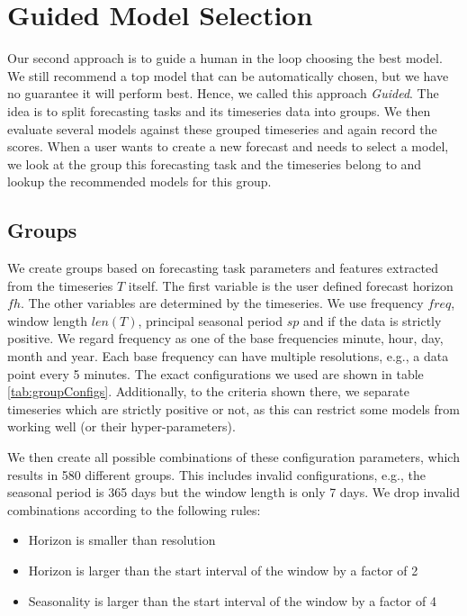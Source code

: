 \section{Guided Model Selection}
\label{sec:guidedModelSelection}

Our second approach is to guide a human in the loop choosing the best model. We still recommend a top model that can be automatically chosen, but we have no guarantee it will perform best. Hence, we called this approach \emph{Guided}. The idea is to split forecasting tasks and its timeseries data into groups. We then evaluate several models against these grouped timeseries and again record the scores. When a user wants to create a new forecast and needs to select a model, we look at the group this forecasting task and the timeseries belong to and lookup the recommended models for this group.

\subsection{Groups}

We create groups based on forecasting task parameters and features extracted from the timeseries $T$ itself. The first variable is the user defined forecast horizon $fh$. The other variables are determined by the timeseries. We use frequency $freq$, window length $len(T)$, principal seasonal period $sp$ and if the data is strictly positive. We regard frequency as one of the base frequencies minute, hour, day, month and year. Each base frequency can have multiple resolutions, e.g., a data point every 5 minutes. The exact configurations we used are shown in table \ref{tab:groupConfigs}. Additionally, to the criteria shown there, we separate timeseries which are strictly positive or not, as this can restrict some models from working well (or their hyper-parameters).

We then create all possible combinations of these configuration parameters, which results in 580 different groups. This includes invalid configurations, e.g., the seasonal period is 365 days but the window length is only 7 days. We drop invalid combinations according to the following rules:

\begin{itemize}
    \setlength\itemsep{.1cm}
    \item Horizon is smaller than resolution
    \item Horizon is larger than the start interval of the window by a factor of 2
    \item Seasonality is larger than the start interval of the window by a factor of 4
\end{itemize}



